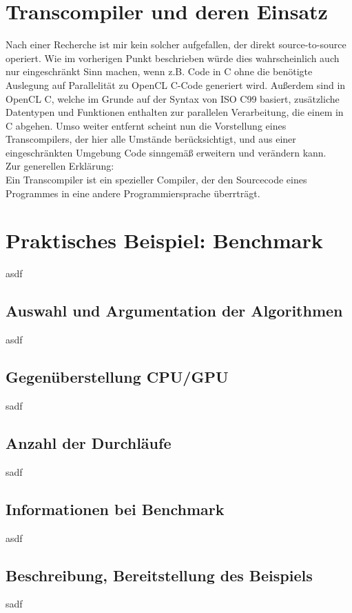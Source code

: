 \documentclass[letterpaper, 12pt]{article}
\let\tempsection\section
\renewcommand\section[1]{\vspace{-0.3cm}\tempsection{#1}\vspace{-0.3cm}}
\let\tempsubsection\subsection
\renewcommand\subsection[1]{\vspace{0cm}\tempsubsection{#1}\vspace{0cm}}
\begin{document}
\section{Transcompiler und deren Einsatz}
Nach einer Recherche ist mir kein solcher aufgefallen, der direkt source-to-source operiert. Wie im vorherigen Punkt beschrieben würde dies wahrscheinlich auch nur eingeschränkt Sinn machen, wenn z.B. Code in C ohne die benötigte Auslegung auf Parallelität zu OpenCL C-Code generiert wird. Außerdem sind in OpenCL C, welche im Grunde auf der Syntax von ISO C99 basiert, zusätzliche Datentypen und Funktionen enthalten zur parallelen Verarbeitung, die einem in C abgehen. Umso weiter entfernt scheint nun die Vorstellung eines Transcompilers, der hier alle Umstände berücksichtigt, und aus einer eingeschränkten Umgebung Code sinngemäß erweitern und verändern kann. \\
Zur generellen Erklärung: \\
Ein Transcompiler ist ein spezieller Compiler, der den Sourcecode eines Programmes in eine andere Programmiersprache überrträgt. \cite{transpiler}

\section{Praktisches Beispiel: Benchmark}
asdf
\subsection{Auswahl und Argumentation der Algorithmen}
asdf
\subsection{Gegenüberstellung CPU/GPU}
sadf
\subsection{Anzahl der Durchläufe}
sadf
\subsection{Informationen bei Benchmark}
asdf
\subsection{Beschreibung, Bereitstellung des Beispiels}
sadf

\newpage



\lstlistoflistings
\listoffigures
\end{document}
